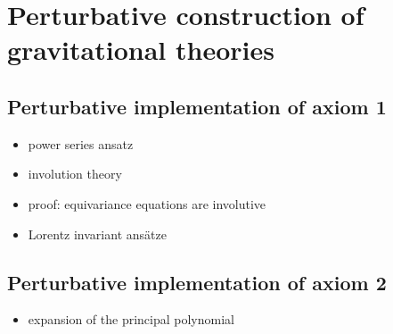 \chapter{Perturbative construction of gravitational theories}

\section{Perturbative implementation of axiom 1}
\begin{itemize}
\item power series ansatz
\item involution theory
\item proof: equivariance equations are involutive
\item Lorentz invariant ansätze
\end{itemize}

\section{Perturbative implementation of axiom 2}
\begin{itemize}
\item expansion of the principal polynomial
\end{itemize}

